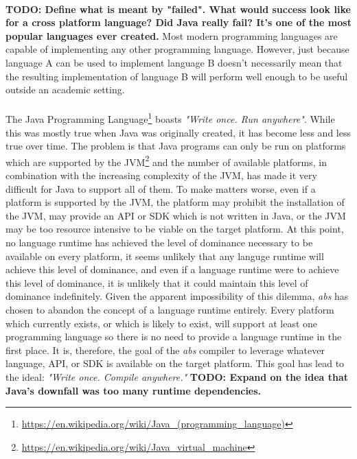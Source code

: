 \documentclass[hidelinks]{article}
\begin{document}
\paragraph{}\textbf{TODO: Define what is meant by "failed". What would success look like for a cross platform language? Did Java really fail? It's one of the most popular languages ever created.} Most modern programming languages are capable of implementing any other programming language. However, just because language A can be used to implement language B doesn't necessarily mean that the resulting implementation of language B will perform well enough to be useful outside an academic setting.
\paragraph{}The Java Programming Language\footnote{\url{https://en.wikipedia.org/wiki/Java_(programming_language)}} boasts \textit{"Write once. Run anywhere"}. While this was mostly true when Java was originally created, it has become less and less true over time. The problem is that Java programs can only be run on platforms which are supported by the JVM\footnote{\url{https://en.wikipedia.org/wiki/Java_virtual_machine}} and the number of available platforms, in combination with the increasing complexity of the JVM, has made it very difficult for Java to support all of them. To make matters worse, even if a platform is supported by the JVM, the platform may prohibit the installation of the JVM, may provide an API or SDK which is not written in Java, or the JVM may be too resource intensive to be viable on the target platform. At this point, no language runtime has achieved the level of dominance necessary to be available on every platform, it seems unlikely that any languge runtime will achieve this level of dominance, and even if a language runtime were to achieve this level of dominance, it is unlikely that it could maintain this level of dominance indefinitely. Given the apparent impossibility of this dilemma, \textit{abs} has chosen to abandon the concept of a language runtime entirely. Every platform which currently exists, or which is likely to exist, will support at least one programming language so there is no need to provide a language runtime in the first place. It is, therefore, the goal of the \textit{abs} compiler to leverage whatever language, API, or SDK is available on the target platform. This goal has lead to the ideal: \textit{"Write once. Compile anywhere."}
\textbf{TODO: Expand on the idea that Java's downfall was too many runtime dependencies.}
\end{document}
